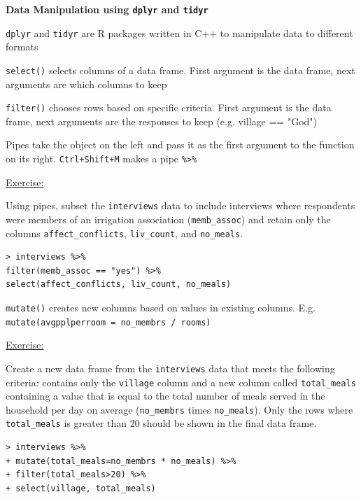 \documentclass[12pt]{article}
\begin{document}
\textbf{Data Manipulation using \texttt{dplyr} and \texttt{tidyr}}

\texttt{dplyr} and \texttt{tidyr} are R packages written in C++ to manipulate data to different formats

\texttt{select()} selects columns of a data frame. First argument is the data frame, next arguments are which columns to keep

\texttt{filter()} chooses rows based on specific criteria. First argument is the data frame, next arguments are the responses to keep (e.g. village == "God")

Pipes take the object on the left and pass it as the first argument to the function on its right. \texttt{Ctrl+Shift+M} makes a pipe \texttt{\%\textgreater\%}


\vspace{0.5em}
\begin{addmargin}[1cm]{0cm}
\color{gray}
\underline{Exercise:}

Using pipes, subset the \texttt{interviews} data to include interviews where respondents were members of an irrigation association (\texttt{memb\_assoc}) and retain only the columns \texttt{affect\_conflicts}, \texttt{liv\_count}, and \texttt{no\_meals}.

\color{black}\vspace{0.5em}

\begin{verbatim}
> interviews %>%
filter(memb_assoc == "yes") %>%
select(affect_conflicts, liv_count, no_meals)
\end{verbatim}

\end{addmargin}

\texttt{mutate()} creates new columns based on values in existing columns. E.g. \texttt{mutate(avgpplperroom = no\_membrs / rooms)}

\vspace{0.5em}
\begin{addmargin}[1cm]{0cm}
\color{gray}
\underline{Exercise:}

Create a new data frame from the \texttt{interviews} data that meets the following criteria: contains only the \texttt{village} column and a new column called \texttt{total\_meals} containing a value that is equal to the total number of meals served in the household per day on average (\texttt{no\_membrs} times \texttt{no\_meals}). Only the rows where \texttt{total\_meals} is greater than 20 should be shown in the final data frame.

\color{black}\vspace{0.5em}

\begin{verbatim}
> interviews %>% 
+ mutate(total_meals=no_membrs * no_meals) %>% 
+ filter(total_meals>20) %>% 
+ select(village, total_meals)
\end{verbatim}
\end{addmargin}
\end{document}
